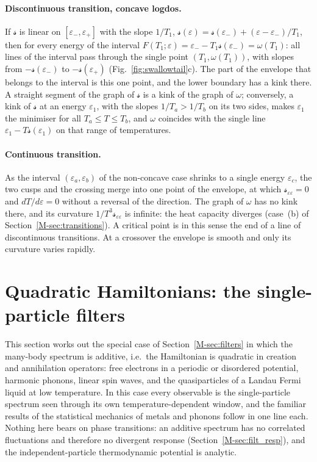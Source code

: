 \documentclass[10pt,a4paper]{article}
\theoremstyle{plain}
\theoremstyle{remark}
\newcommand{\lndos}{{logdos}}  %
\newcommand{\lds}{\mathscr{s}}  %
\begin{document}
\paragraph{Discontinuous transition, concave \lndos.} If $\lds$ is linear on
$[\varepsilon_-,\varepsilon_+]$ with the slope $1/T_1$,
$\lds(\varepsilon)=\lds(\varepsilon_-)+(\varepsilon-\varepsilon_-)/T_1$, then
for every energy of the interval
$F(T_1;\varepsilon)=\varepsilon_--T_1\lds(\varepsilon_-)=\omega(T_1)$: all
lines of the interval pass through the single point $(T_1,\omega(T_1))$,
with slopes from $-\lds(\varepsilon_-)$ to $-\lds(\varepsilon_+)$
(Fig.~\ref{fig:swallowtail}c). The part of the envelope that belongs to the
interval is this one point, and the lower boundary has a kink there. A
straight segment of the graph of $\lds$ is a kink of the graph of $\omega$;
conversely, a kink of $\lds$ at an energy $\varepsilon_1$, with the slopes
$1/T_a>1/T_b$ on its two sides, makes $\varepsilon_1$ the minimiser for all
$T_a\le T\le T_b$, and $\omega$ coincides with the single line
$\varepsilon_1-T\lds(\varepsilon_1)$ on that range of temperatures.

\paragraph{Continuous transition.} As the interval
$(\varepsilon_a,\varepsilon_b)$ of the non-concave case shrinks to a single
energy $\varepsilon_c$, the two cusps and the crossing merge into one point
of the envelope, at which $\lds_{\varepsilon\varepsilon}=0$ and
$dT/d\varepsilon=0$ without a reversal of the direction. The graph of
$\omega$ has no kink there, and its curvature
$1/T^{3}\lds_{\varepsilon\varepsilon}$ is infinite: the heat capacity
diverges (case~(b) of Section~\ref{M-sec:transitions}). A critical point is
in this sense the end of a line of discontinuous transitions. At a
crossover the envelope is smooth and only its curvature varies rapidly.

\section{Quadratic Hamiltonians: the single-particle filters}
\label{app:quadratic}

This section works out the special case of Section~\ref{M-sec:filters} in which
the many-body spectrum is additive, i.e.\ the Hamiltonian is quadratic in
creation and annihilation operators: free electrons in a periodic or disordered
potential, harmonic phonons, linear spin waves, and the quasiparticles of a
Landau Fermi liquid at low temperature. In this case every observable is the
single-particle spectrum seen through its own temperature-dependent window, and
the familiar results of the statistical mechanics of metals and phonons follow
in one line each. Nothing here bears on phase transitions: an additive spectrum
has no correlated fluctuations and therefore no divergent response
(Section~\ref{M-sec:filt_resp}), and the independent-particle thermodynamic
potential is analytic.
\end{document}
